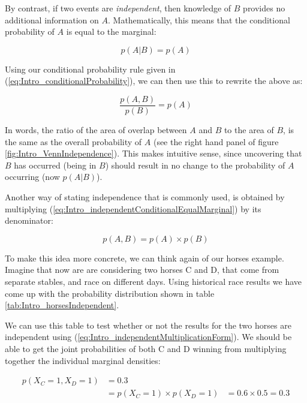 \documentclass[11pt,fullpage]{book}
\begin{document}
By contrast, if two events are \textit{independent}, then knowledge of $B$ provides no additional information on $A$. Mathematically, this means that the conditional probability of $A$ is equal to the marginal:

\begin{equation}\label{eq:Intro_independentConditionalEqualMarginal}
p(A|B) = p(A)
\end{equation}

Using our conditional probability rule given in (\ref{eq:Intro_conditionalProbability}), we can then use this to rewrite the above as:

\begin{equation}\label{eq:Intro_independentConditionalEqualMarginal1}
\frac{p(A,B)}{p(B)} = p(A)
\end{equation}

In words, the ratio of the area of overlap between $A$ and $B$ to the area of $B$, is the same as the overall probability of $A$ (see the right hand panel of figure \ref{fig:Intro_VennIndependence}). This makes intuitive sense, since uncovering that $B$ has occurred (being in $B$) should result in no change to the probability of $A$ occurring (now $p(A|B)$).

Another way of stating independence that is commonly used, is obtained by multiplying (\ref{eq:Intro_independentConditionalEqualMarginal}) by its denominator:

\begin{equation}\label{eq:Intro_independentMultiplicationForm}
p(A,B) = p(A)\times p(B)
\end{equation}

To make this idea more concrete, we can think again of our horses example. Imagine that now are are considering two horses C and D, that come from separate stables, and race on different days. Using historical race results we have come up with the probability distribution shown in table \ref{tab:Intro_horsesIndependent}. 

We can use this table to test whether or not the results for the two horses are independent using (\ref{eq:Intro_independentMultiplicationForm}). We should be able to get the joint probabilities of both C and D winning from multiplying together the individual marginal densities:

\begin{equation}
\begin{align}
p(X_C=1,X_D=1) &= 0.3\\
&= p(X_C=1) \times p(X_D=1) 
&= 0.6 \times 0.5 = 0.3
\end{align}
\end{equation}
\end{document}
